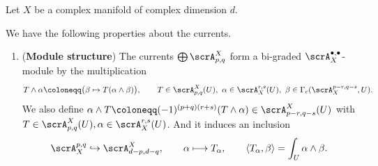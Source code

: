\begin{proposition}[label=\labelNFM{prop:basic-properties-of-currents}, status=draft, tag=0000000]
	Let $X$ be a complex manifold of complex dimension $d$.

	We have the following properties about the currents.
	\begin{enumerate}
		\item (\textbf{Module structure}) The currents $\bigoplus \scrA^X_{p,q}$ form a bi-graded  $\scrA_X^{\bullet,\bullet}$-module by the multiplication
		      \[ T \wedge \alpha \coloneqq \bigl( \beta \mapsto T(\alpha \wedge \beta) \bigr), \qquad T \in \scrA^X_{p,q}(U),\ \alpha \in \scrA_X^{r,s}(U),\ \beta \in \Gamma_c(\scrA_X^{p-r,q-s},U). \]
		      We also define $\alpha \wedge T \coloneqq (-1)^{(p+q)(r+s)}(T \wedge \alpha) \in \scrA^X_{p-r,q-s}(U)$ with $T \in \scrA^X_{p,q}(U),\alpha \in \scrA_X^{r,s}(U)$.
		      And it induces an inclusion
		      \[
			      \scrA_X^{p,q} \hookrightarrow \scrA_{d-p,d-q}^X, \qquad \alpha\longmapsto T_\alpha, \qquad \langle T_\alpha,\beta\rangle = \int_U \alpha \wedge \beta.
		      \]


\end{enumerate}
\end{proposition}
